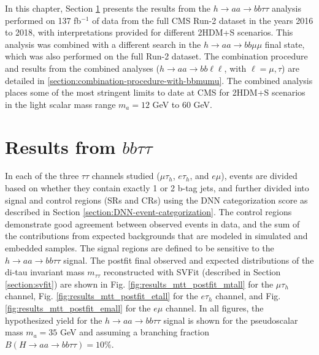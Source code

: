 In this chapter, Section \ref{section:bbtautau_results} presents the results from the $h \rightarrow aa \rightarrow bb\tau\tau$ analysis performed on 137 fb$^{-1}$ of data from the full CMS Run-2 dataset in the years 2016 to 2018, with interpretations provided for different 2HDM+S scenarios. This analysis was combined with a different search in the $h\rightarrow aa \rightarrow bb\mu\mu$ final state, which was also performed on the full Run-2 dataset. The combination procedure and results from the combined analyses ($h \rightarrow aa \rightarrow bb\ell\ell$, with $\ell = \mu, \tau$) are detailed in \ref{section:combination-procedure-with-bbmumu}. The combined analysis places some of the most stringent limits to date at CMS for 2HDM+S scenarios in the light scalar mass range $m_a = 12$ GeV to 60 GeV.

\section{Results from \texorpdfstring{$bb\tau\tau$}{bbtautau}}
\label{section:bbtautau_results}
In each of the three $\tau\tau$ channels studied ($\mu\tau_{h}$, $e\tau_{h}$, and $e\mu$), events are divided based on whether they contain exactly 1 or 2 b-tag jets, and further divided into signal and control regions (SRs and CRs) using the DNN categorization score as described in Section \ref{section:DNN-event-categorization}. The control regions demonstrate good agreement between observed events in data, and the sum of the contributions from expected backgrounds that are modeled in simulated and embedded samples. The signal regions are defined to be sensitive to the $h \rightarrow aa \rightarrow bb\tau\tau$ signal. The postfit final observed and expected distributions of the di-tau invariant mass $m_{\tau\tau}$ reconstructed with SVFit (described in Section \ref{section:svfit}) are shown in Fig. \ref{fig:results_mtt_postfit_mtall} for the $\mu\tau_{h}$ channel, Fig. \ref{fig:results_mtt_postfit_etall} for the $e\tau_{h}$ channel, and Fig. \ref{fig:results_mtt_postfit_emall} for the $e\mu$ channel. In all figures, the hypothesized yield for the $h\rightarrow aa \rightarrow bb\tau\tau$ signal is shown for the pseudoscalar mass $m_a = 35$ GeV and assuming a branching fraction $B(H \rightarrow aa \rightarrow bb\tau\tau) = 10\%$.
